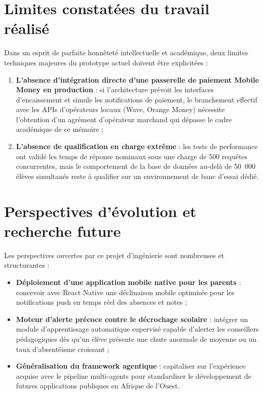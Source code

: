 \section*{Limites constatées du travail réalisé}

Dans un esprit de parfaite honnêteté intellectuelle et académique, deux limites techniques majeures du prototype actuel doivent être explicitées :

\begin{enumerate}
  \item \textbf{L'absence d'intégration directe d'une passerelle de paiement Mobile Money en production} : si l'architecture prévoit les interfaces d'encaissement et simule les notifications de paiement, le branchement effectif avec les APIs d'opérateurs locaux (Wave, Orange Money) nécessite l'obtention d'un agrément d'opérateur marchand qui dépasse le cadre académique de ce mémoire ;
  \item \textbf{L'absence de qualification en charge extrême} : les tests de performance ont validé les temps de réponse nominaux sous une charge de 500 requêtes concurrentes, mais le comportement de la base de données au-delà de 50~000 élèves simultanés reste à qualifier sur un environnement de banc d'essai dédié.
\end{enumerate}

\section*{Perspectives d'évolution et recherche future}

Les perspectives ouvertes par ce projet d'ingénierie sont nombreuses et structurantes :

\begin{itemize}
  \item \textbf{Déploiement d'une application mobile native pour les parents} : concevoir avec React Native une déclinaison mobile optimisée pour les notifications push en temps réel des absences et notes ;
  \item \textbf{Moteur d'alerte précoce contre le décrochage scolaire} : intégrer un module d'apprentissage automatique supervisé capable d'alerter les conseillers pédagogiques dès qu'un élève présente une chute anormale de moyenne ou un taux d'absentéisme croissant ;
  \item \textbf{Généralisation du framework agentique} : capitaliser sur l'expérience acquise avec le pipeline multi-agents pour standardiser le développement de futures applications publiques en Afrique de l'Ouest.
\end{itemize}
